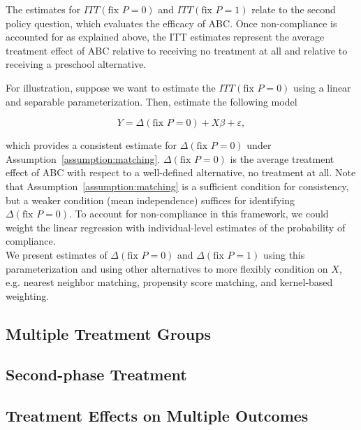 \noindent The estimates for $ITT \left( \text{fix } P = 0 \right) $ and $ITT \left( \text{fix } P = 1 \right)$ relate to the second policy question, which evaluates the efficacy of ABC. Once non-compliance is accounted for as explained above, the ITT estimates represent the average treatment effect of ABC relative to receiving no treatment at all and relative to receiving a preschool alternative.

\noindent For illustration, suppose we want to estimate the $ITT \left( \text{fix } P = 0 \right)$ using a linear and separable parameterization. Then, estimate the following model 

\begin{equation}
Y = \Delta \left( \text{fix } P = 0 \right) + X \beta + \varepsilon, 
\end{equation}

\noindent which provides a consistent estimate for $\Delta \left( \text{fix } P = 0 \right)$ under Assumption~\ref{assumption:matching}. $\Delta \left( \text{fix } P = 0 \right)$ is the average treatment effect of ABC with respect to a well-defined alternative, no treatment at all. Note that Assumption~\ref{assumption:matching} is a sufficient condition for consistency, but a weaker condition (mean independence) suffices for identifying $\Delta \left( \text{fix } P = 0 \right)$. To account for non-compliance in this framework, we could weight the linear regression with individual-level estimates of the probability of compliance.\\

\noindent We present estimates of $\Delta \left( \text{fix } P = 0 \right)$ and $\Delta \left( \text{fix } P = 1 \right)$ using this parameterization and using other alternatives to more flexibly  condition on $X$, e.g. nearest neighbor matching, propensity score matching, and kernel-based weighting.

\subsection{Multiple Treatment Groups}

\subsection{Second-phase Treatment}

\subsection{Treatment Effects on Multiple Outcomes}

\clearpage
\singlespace



 
\clearpage
\singlespace



 